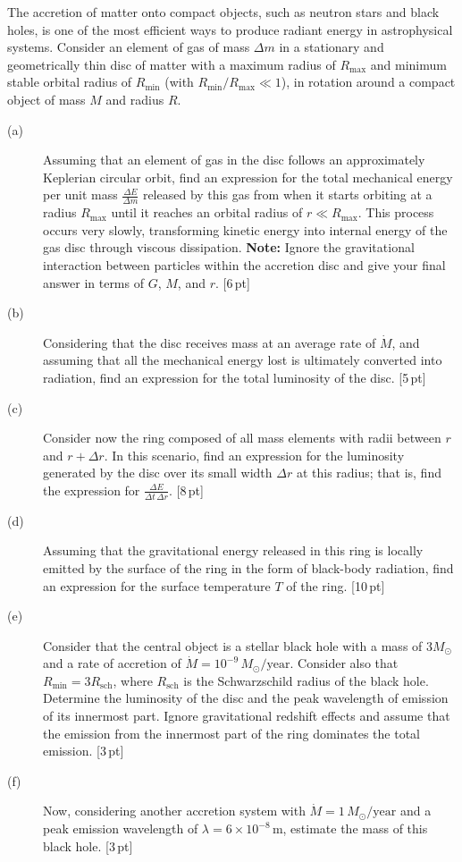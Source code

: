 The accretion of matter onto compact objects, such as neutron stars and black
holes, is one of the most efficient ways to produce radiant energy in
astrophysical systems. Consider an element of gas of mass $\Delta m$ in a
stationary and geometrically thin disc of matter with a maximum radius of
$R_{\mathrm{max}}$ and minimum stable orbital radius of $R_{\mathrm{min}}$
(with $R_{\mathrm{min}}/R_{\mathrm{max}} \ll 1$), in rotation around a compact
object of mass $M$ and radius $R$.

\begin{description}
\item[(a)] Assuming that an element of gas in the disc follows an
  approximately Keplerian circular orbit, find an expression for the total
  mechanical energy per unit mass $\frac{\Delta E}{\Delta m}$ released by this
  gas from when it starts orbiting at a radius $R_{\mathrm{max}}$ until it
  reaches an orbital radius of $r \ll R_{\mathrm{max}}$. This process occurs
  very slowly, transforming kinetic energy into internal energy of the gas
  disc through viscous dissipation. \textbf{Note:} Ignore the gravitational
  interaction between particles within the accretion disc and give your final
  answer in terms of $G$, $M$, and $r$. \hfill[6\,pt]
\item[(b)] Considering that the disc receives mass at an average rate of
  $\dot{M}$, and assuming that all the mechanical energy lost is ultimately
  converted into radiation, find an expression for the total luminosity of the
  disc. \hfill[5\,pt]
\item[(c)] Consider now the ring composed of all mass elements with radii
  between $r$ and $r + \Delta r$. In this scenario, find an expression for the
  luminosity generated by the disc over its small width $\Delta r$ at this
  radius; that is, find the expression for
  $\frac{\Delta E}{\Delta t\,\Delta r}$. \hfill[8\,pt]
\item[(d)] Assuming that the gravitational energy released in this ring is
  locally emitted by the surface of the ring in the form of black-body
  radiation, find an expression for the surface temperature $T$ of the ring.
  \hfill[10\,pt]
\item[(e)] Consider that the central object is a stellar black hole with a
  mass of $3M_\odot$ and a rate of accretion of
  $\dot{M} = 10^{-9}\,M_\odot/\mathrm{year}$. Consider also that
  $R_{\mathrm{min}} = 3R_{\mathrm{sch}}$, where $R_{\mathrm{sch}}$ is the
  Schwarzschild radius of the black hole. Determine the luminosity of the disc
  and the peak wavelength of emission of its innermost part. Ignore
  gravitational redshift effects and assume that the emission from the
  innermost part of the ring dominates the total emission. \hfill[3\,pt]
\item[(f)] Now, considering another accretion system with
  $\dot{M} = 1\,M_\odot/\mathrm{year}$ and a peak emission wavelength of
  $\lambda = 6 \times 10^{-8}$\,m, estimate the mass of this black hole.
  \hfill[3\,pt]
\end{description}
